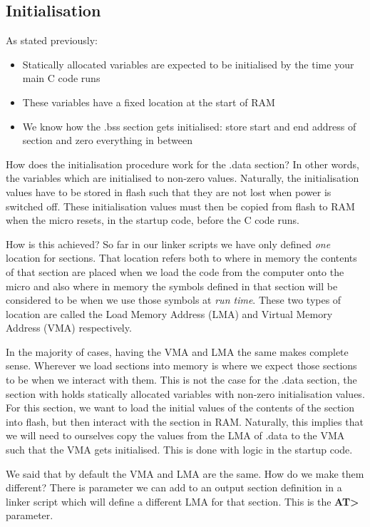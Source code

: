 \subsection{Initialisation}
As stated previously:
\begin{itemize}
  \item Statically allocated variables are expected to be initialised by the time your main C code runs
  \item These variables have a fixed location at the start of RAM
  \item We know how the .bss section gets initialised: store start and end address of section and zero everything in between
\end{itemize}
How does the initialisation procedure work for the .data section? In other words, the variables which are initialised to non-zero values.
Naturally, the initialisation values have to be stored in flash such that they are not lost when power is switched off.
These initialisation values must then be copied from flash to RAM when the micro resets, in the startup code, before the C code runs.

How is this achieved? 
So far in our linker scripts we have only defined \emph{one} location for sections. That location refers both to where in memory the contents of that section are placed when we load the code from the computer onto the micro and also where in memory the symbols defined in that section will be considered to be when we use those symbols at \emph{run time}. These two types of location are called the Load Memory Address (LMA) and Virtual Memory Address (VMA) respectively.

In the majority of cases, having the VMA and LMA the same makes complete sense. Wherever we load sections into memory is where we expect those sections to be when we interact with them.
This is not the case for the .data section, the section with holds statically allocated variables with non-zero initialisation values. 
For this section, we want to load the initial values of the contents of the section into flash, but then interact with the section in RAM.
Naturally, this implies that we will need to ourselves copy the values from the LMA of .data to the VMA such that the VMA gets initialised. This is done with logic in the startup code.

We said that by default the VMA and LMA are the same. How do we make them different? There is parameter we can add to an output section definition in a linker script which will define a different LMA for that section. This is the \textbf{AT>} parameter.

